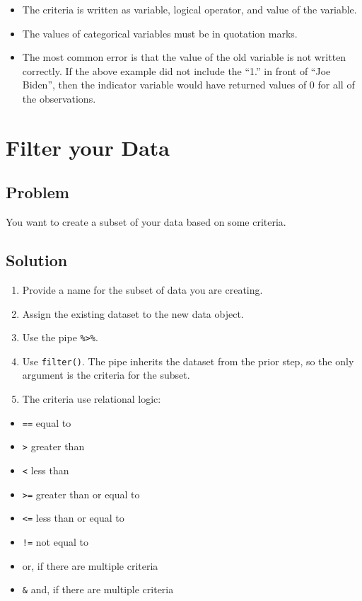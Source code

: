 \documentclass[
]{book}
\providecommand{\tightlist}{%
  \setlength{\itemsep}{0pt}\setlength{\parskip}{0pt}}
\begin{document}
\begin{itemize}
\tightlist
\item
  The criteria is written as variable, logical operator, and value of the variable.
\item
  The values of categorical variables must be in quotation marks.
\item
  The most common error is that the value of the old variable is not written correctly. If the above example did not include the ``1.'' in front of ``Joe Biden'', then the indicator variable would have returned values of 0 for all of the observations.
\end{itemize}

\hypertarget{filter}{%
\section{Filter your Data}\label{filter}}

\hypertarget{problem-21}{%
\subsection{Problem}\label{problem-21}}

You want to create a subset of your data based on some criteria.

\hypertarget{solution-20}{%
\subsection{Solution}\label{solution-20}}

\begin{enumerate}
\def\labelenumi{\arabic{enumi}.}
\tightlist
\item
  Provide a name for the subset of data you are creating.
\item
  Assign the existing dataset to the new data object.
\item
  Use the pipe \texttt{\%\textgreater{}\%}.
\item
  Use \texttt{filter()}. The pipe inherits the dataset from the prior step, so the only argument is the criteria for the subset.
\item
  The criteria use relational logic:
\end{enumerate}

\begin{itemize}
\tightlist
\item
  \texttt{==} equal to
\item
  \texttt{\textgreater{}} greater than
\item
  \texttt{\textless{}} less than
\item
  \texttt{\textgreater{}=} greater than or equal to
\item
  \texttt{\textless{}=} less than or equal to
\item
  \texttt{!=} not equal to
\item
  \texttt{\textbar{}} or, if there are multiple criteria
\item
  \texttt{\&} and, if there are multiple criteria
\end{itemize}
\end{document}
